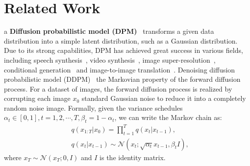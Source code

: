 \section{Related Work}\label{sec:related-work}


\noindent{} a \textbf{Diffusion probabilistic model (DPM)}~\cite{sohl2015deep,ho2020denoising} transforms a given data distribution into a simple latent distribution, such as a Gaussian distribution. 
%
Due to its strong capabilities, DPM has achieved great success in various fields, including speech synthesis~\cite{chen2020wavegrad,kong2020diffwave}, video synthesis~\cite{ho2022video,ho2022imagen}, image super-resolution~\cite{saharia2021image,li2022srdiff}, conditional generation~\cite{choi2021ilvr,wang2022pretraining}\sqq{,} and image-to-image translation~\cite{saharia2021palette,sasaki2021unit}.
%
Denoising diffusion probabilistic model (DDPM)~\cite{ho2020denoising}  the Markovian property of the forward diffusion process.
For a dataset of images, the forward diffusion process is realized by corrupting each image $x_0$  standard Gaussian noise to reduce it into a completely random noise image. 
%
Formally, given the variance schedules $\alpha_t\in[0,1],t=1,2,\cdots,T, \beta_t=1-\alpha_t$, we can write the Markov chain as:
%
\begin{align}
& q(x_{1:T}|x_0)=\prod_{t=1}^T q(x_t|x_{t-1}),\\
& q(x_t|x_{t-1})\sim\mathcal N(x_t;\sqrt{\alpha_t}x_{t-1},\beta_t I),
\end{align}
%
where $x_T\sim\mathcal N(x_T;0,I)$ and $I$ is the identity matrix.


